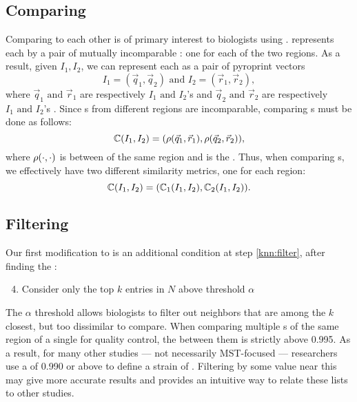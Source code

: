 \subsection{Comparing \Isols{}}
Comparing \isols{} to each other is of primary interest to biologists using \cplop{}.
\cplop{} represents each \isol{} by a pair of mutually incomparable \pyros{}: one for each of the two \itsshort{} regions.
As a result, given \isols{} $I_1, I_2$, we can represent each as a pair of pyroprint vectors 
\[I_1 = (\vec{q}_1, \vec{q}_2) \text{ and } I_2 = (\vec{r}_1, \vec{r}_2),
\]
where $\vec{q}_1 \text{ and } \vec{r}_1$ are respectively $I_1 \text{ and } I_2$'s \Ssixt{} \pyro{} and $\vec{q}_2 \text{ and } \vec{r}_2$ are respectively $I_1 \text{ and } I_2$'s \Sfive{} \pyro{} \cite{Black2014121}. Since \pyro{}s from different regions are incomparable, comparing \isol{}s must be done as follows:
\[
\mathbb{C}{}(I_1, I_2) = (\rho(\vec{q}_1, \vec{r}_1), \rho(\vec{q}_2, \vec{r}_2)),
\]
where $\rho(\cdot,\cdot)$ is between \pyros{} of the same \itsshort{} region and is the \pearson{}. Thus, when comparing \isol{}s, we effectively have two different similarity metrics, one for each \itsshort{} region:
\[
\mathbb{C}{}(I_1, I_2) = (\mathbb{C}_{1}{}(I_1, I_2), \mathbb{C}_{2}{}(I_1, I_2)).
\]



\subsection{\a{} Filtering}
Our first modification to \kNN{} is an additional condition at step \ref{knn:filter}, after finding the \knnlong{}:
\begin{enumerate}
\setcounter{enumi}{3}
\item Consider only the top $k$ entries in $N$ above threshold $\alpha$
\end{enumerate}
The $\alpha$ threshold allows biologists to filter out neighbors that are among the $k$ closest, but too dissimilar to compare. 
When comparing multiple \pyro{}s of the same region of a single \isol{} for quality control, the \pearson{} between them is strictly above 0.995.
As a result, for many other studies --- not necessarily MST-focused --- \cplop{} researchers use a \pearson{} of 0.990 or above to define a strain of \ecoli{}.
Filtering by some value near this may give more accurate results and provides an intuitive way to relate these lists to other studies.


